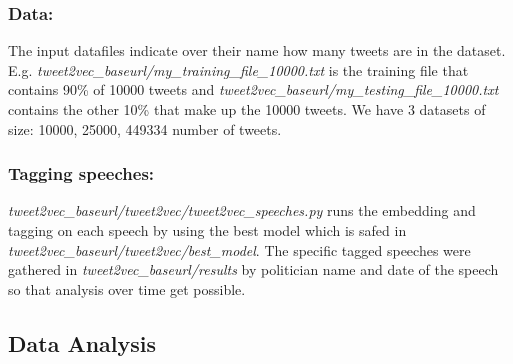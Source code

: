 \documentclass[10pt,conference,compsocconf]{IEEEtran}
\begin{document}
\subsubsection{Data:}
 The input datafiles indicate over their name how many tweets are in the dataset. E.g. \textit{tweet2vec\_baseurl/my\_training\_file\_10000.txt} is the training file that contains 90\% of 10000 tweets and \textit{tweet2vec\_baseurl/my\_testing\_file\_10000.txt} contains the other 10\% that make up the 10000 tweets. We have 3 datasets of size: 10000, 25000, 449334 number of tweets. 

\subsubsection{Tagging speeches:}
\textit{tweet2vec\_baseurl/tweet2vec/tweet2vec\_speeches.py} runs the embedding and tagging on each speech by using the best model which is safed in \textit{tweet2vec\_baseurl/tweet2vec/best\_model}. The specific tagged speeches were gathered in \textit{tweet2vec\_baseurl/results} by politician name and date of the speech so that analysis over time get possible.

\subsection{Data Analysis}





\end{document}
